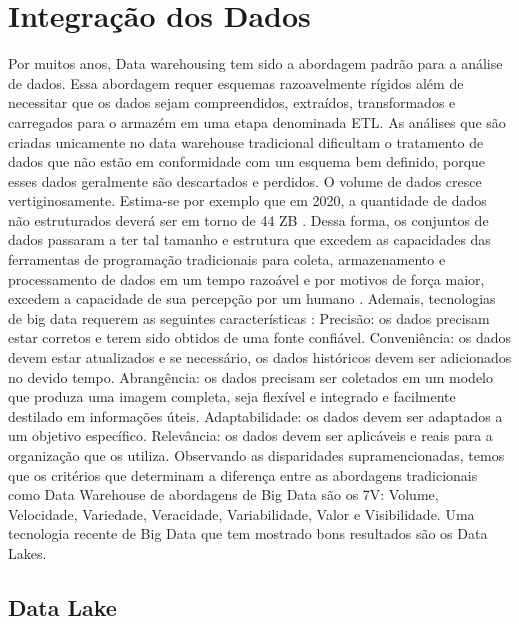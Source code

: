 \chapter{Integração dos Dados}

Por muitos anos, Data warehousing tem sido a abordagem padrão para a análise de dados. Essa abordagem requer esquemas razoavelmente rígidos além de necessitar que os dados sejam compreendidos, extraídos, transformados e carregados para o armazém em uma etapa denominada ETL. As análises que são criadas unicamente no data warehouse tradicional dificultam o tratamento de dados que não estão em conformidade com um esquema bem definido, porque esses dados geralmente são descartados e perdidos.
O volume de dados cresce vertiginosamente. Estima-se por exemplo que em 2020, a quantidade de dados não estruturados deverá ser em torno de 44 ZB \cite{turner2014digital}.
Dessa forma, os conjuntos de dados passaram a ter tal tamanho e estrutura que excedem as capacidades das ferramentas de programação tradicionais para coleta, armazenamento e processamento de dados em um tempo razoável e por motivos de força maior, excedem a capacidade de sua percepção por um humano \cite{miloslavskaya2014information}.
Ademais, tecnologias de big data requerem as seguintes características \cite{miloslavskaya2016big}:
Precisão: os dados precisam estar corretos e terem sido obtidos de uma fonte confiável.
Conveniência: os dados devem estar atualizados e se necessário, os dados históricos devem ser adicionados no devido tempo.
Abrangência: os dados precisam ser coletados em um modelo que produza uma imagem completa, seja flexível e integrado e facilmente destilado em informações úteis.
Adaptabilidade: os dados devem ser adaptados a um objetivo específico.
Relevância: os dados devem ser aplicáveis ​​e reais para a organização que os utiliza.
Observando as disparidades supramencionadas, temos que os critérios que determinam a diferença entre as abordagens tradicionais como Data Warehouse de abordagens de Big Data são os 7V: Volume, Velocidade, Variedade, Veracidade, Variabilidade, Valor e Visibilidade.
Uma tecnologia recente de Big Data que tem mostrado bons resultados são os Data Lakes.

\section{Data Lake}

